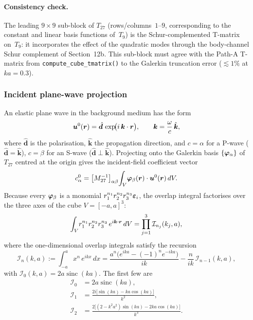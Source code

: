 \paragraph{Consistency check.}
The leading $9 \times 9$ sub-block of $T_{27}$ (rows/columns~$1$--$9$,
corresponding to the constant and linear basis functions of~$T_9$)
is the Schur-complemented T-matrix on~$T_9$: it incorporates the
effect of the quadratic modes through the body-channel Schur
complement of Section~12b.  This sub-block must agree with the Path-A
T-matrix from \texttt{compute\_cube\_tmatrix()} to the Galerkin
truncation error ($\lesssim 1\%$ at $ka = 0.3$).

\subsubsection{Incident plane-wave projection}
\label{sec:incident-projection}

An elastic plane wave in the background medium has the form
\begin{equation}
  \bm{u}^0(\bm{r}) = \hat{\bm{d}}\,\exp\!\bigl(i\,\bm{k}\cdot\bm{r}\bigr),
  \qquad
  \bm{k} = \frac{\omega}{c}\,\hat{\bm{k}},
  \label{eq:plane-wave}
\end{equation}
where $\hat{\bm{d}}$ is the polarisation, $\hat{\bm{k}}$ the
propagation direction, and $c = \alpha$ for a P-wave ($\hat{\bm{d}} = \hat{\bm{k}}$),
$c = \beta$ for an S-wave ($\hat{\bm{d}} \perp \hat{\bm{k}}$).
Projecting onto the Galerkin basis $\{\bm{\varphi}_\alpha\}$ of $T_{27}$
centred at the origin gives the incident-field coefficient vector
\begin{equation}
  c^0_\alpha
  = \bigl[M_{27}^{-1}\bigr]_{\alpha\beta}\!
    \int_{V}\!\bm{\varphi}_\beta(\bm{r})\cdot\bm{u}^0(\bm{r})\,dV.
  \label{eq:c0-projection}
\end{equation}
Because every $\bm{\varphi}_\beta$ is a monomial $r_1^{n_1}r_2^{n_2}r_3^{n_3}\bm{\varepsilon}_i$,
the overlap integral factorises over the three axes of the cube
$V = [-a,a]^3$:
\begin{equation}
  \int_{V}\!r_1^{n_1}r_2^{n_2}r_3^{n_3}\,e^{i\bm{k}\cdot\bm{r}}\,dV
  = \prod_{j=1}^{3}\mathcal{I}_{n_j}(k_j,a),
  \label{eq:overlap-factorise}
\end{equation}
where the one-dimensional overlap integrals satisfy the recursion
\begin{equation}
  \mathcal{I}_{n}(k,a)
  := \int_{-a}^{a}\!x^n\,e^{ikx}\,dx
  = \frac{a^n\bigl(e^{ika} - (-1)^n e^{-ika}\bigr)}{ik}
    - \frac{n}{ik}\,\mathcal{I}_{n-1}(k,a),
  \label{eq:overlap-recursion}
\end{equation}
with $\mathcal{I}_{0}(k,a) = 2a\operatorname{sinc}(ka)$.  The first
few are
\begin{align}
  \mathcal{I}_0 &= 2a\operatorname{sinc}(ka), \label{eq:I0}\\
  \mathcal{I}_1 &= \frac{2i\bigl[\sin(ka) - ka\cos(ka)\bigr]}{k^2},
  \label{eq:I1}\\
  \mathcal{I}_2 &= \frac{2\bigl[(2-k^2a^2)\sin(ka) - 2ka\cos(ka)\bigr]}{k^3}.
  \label{eq:I2}
\end{align}

